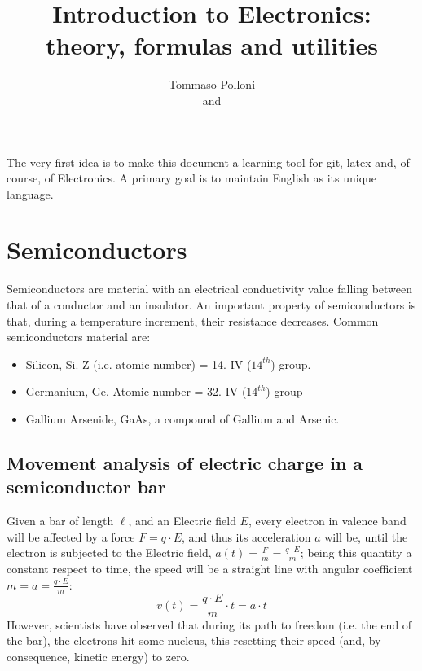 \documentclass[12pt]{article}
\begin{document}
 
 
 
\title{Introduction to Electronics:\\
theory, formulas and utilities}
\author{Tommaso Polloni\\
and }
 
 The very first idea is to make this document a learning tool for git, latex and, of course, of Electronics. A primary goal is to maintain English as its unique language.
\maketitle
\tableofcontents

\section{Semiconductors} 
Semiconductors are material with an electrical conductivity value falling between that of a conductor and an insulator.
An important property of semiconductors is that, during a temperature increment, their resistance decreases.
Common semiconductors material are:
\begin{itemize}
	\item {}Silicon, Si. Z (i.e. atomic number) = 14. IV ($14^{th}$) group.
	\item Germanium, Ge. Atomic number = 32. IV ($14^{th}$) group
	\item Gallium Arsenide, GaAs, a compound of Gallium and Arsenic.
\end{itemize}

\subsection{Movement analysis of electric charge in a semiconductor bar}
Given a bar of length $\ell$, and an Electric field $E$, every electron in valence band will be affected by a force $F = q \cdot E$, and thus its acceleration $a$ will be, until the electron is subjected to the Electric field, $a(t)= \frac{F}{m} = \frac{q \cdot E}{m}$; being this quantity a constant respect to time, the speed will be a straight line with angular coefficient $m = a = \frac{q \cdot E}{ m}$:
\begin{equation}
	v(t) = \frac{q \cdot E}{m} \cdot t = a \cdot t
\end{equation}
However, scientists have observed that during its path to freedom (i.e. the end of the bar), the electrons hit some nucleus, this resetting their speed (and, by consequence, kinetic energy) to zero. 
\end{document}
